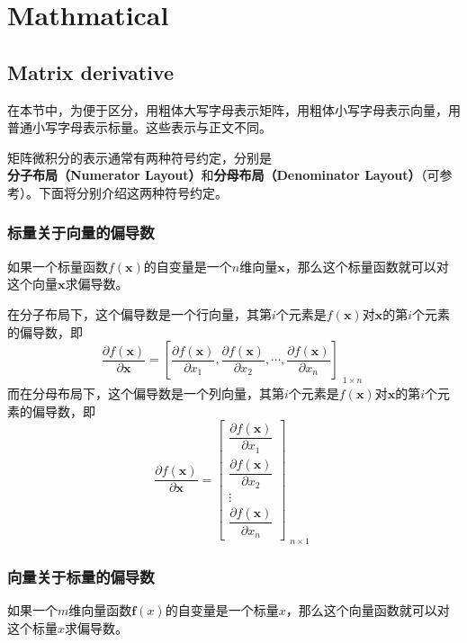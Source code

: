 \appendix
\chapter{Mathmatical}

\section{Matrix derivative}
\label{sec:matrix_derivative}

\begin{hint}
	在本节中，为便于区分，用粗体大写字母表示矩阵，用粗体小写字母表示向量，用普通小写字母表示标量。这些表示与正文不同。
\end{hint}

矩阵微积分的表示通常有两种符号约定，分别是\textbf{分子布局（Numerator Layout）}和\textbf{分母布局（Denominator Layout）}（可参考\cite{petersen2008matrix}）。下面将分别介绍这两种符号约定。

\subsection{标量关于向量的偏导数}
如果一个标量函数$f(\bm{x})$的自变量是一个$n$维向量$\bm{x}$，那么这个标量函数就可以对这个向量$\bm{x}$求偏导数。

在分子布局下，这个偏导数是一个行向量，其第$i$个元素是$f(\bm{x})$对$\bm{x}$的第$i$个元素的偏导数，即
\begin{equation}
	\frac{\partial f(\bm{x})}{\partial \bm{x}}
	=\left[\frac{\partial f(\bm{x})}{\partial x_1},\frac{\partial f(\bm{x})}{\partial x_2},\cdots,\frac{\partial f(\bm{x})}{\partial x_n}\right]_{\substack{\scriptstyle 1\times n}}
\end{equation}
而在分母布局下，这个偏导数是一个列向量，其第$i$个元素是$f(\bm{x})$对$\bm{x}$的第$i$个元素的偏导数，即
\begin{equation}
	\frac{\partial f(\bm{x})}{\partial \bm{x}}
	=\begin{bmatrix}
		\dfrac{\partial f(\bm{x})}{\partial x_1}\\[2ex]
		\dfrac{\partial f(\bm{x})}{\partial x_2}\\[2ex]
		\vdots\\[2ex]
		\dfrac{\partial f(\bm{x})}{\partial x_n}
	\end{bmatrix}_{\substack{\scriptstyle n\times 1}}
\end{equation}

\subsection{向量关于标量的偏导数}
如果一个$m$维向量函数$\bm{f}(x)$的自变量是一个标量$x$，那么这个向量函数就可以对这个标量$x$求偏导数。


